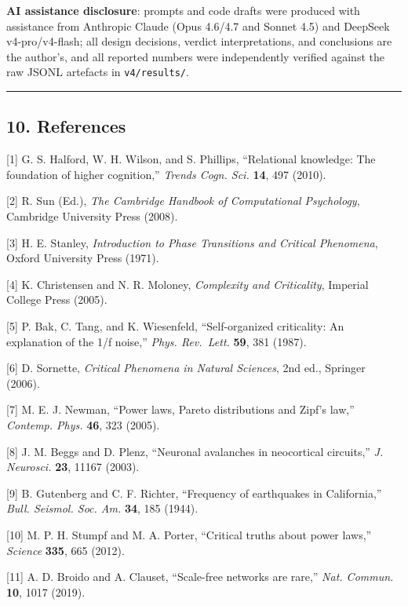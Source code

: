 \documentclass[
  letterpaper,
  11pt]{article}
\begin{document}
\textbf{AI assistance disclosure}: prompts and code drafts were produced
with assistance from Anthropic Claude (Opus 4.6/4.7 and Sonnet 4.5) and
DeepSeek v4-pro/v4-flash; all design decisions, verdict interpretations,
and conclusions are the author's, and all reported numbers were
independently verified against the raw JSONL artefacts in
\texttt{v4/results/}.

\begin{center}\rule{0.5\linewidth}{0.5pt}\end{center}

\subsection{10. References}\label{references}

{[}1{]} G. S. Halford, W. H. Wilson, and S. Phillips, ``Relational
knowledge: The foundation of higher cognition,'' \emph{Trends Cogn.
Sci.} \textbf{14}, 497 (2010).

{[}2{]} R. Sun (Ed.), \emph{The Cambridge Handbook of Computational
Psychology}, Cambridge University Press (2008).

{[}3{]} H. E. Stanley, \emph{Introduction to Phase Transitions and
Critical Phenomena}, Oxford University Press (1971).

{[}4{]} K. Christensen and N. R. Moloney, \emph{Complexity and
Criticality}, Imperial College Press (2005).

{[}5{]} P. Bak, C. Tang, and K. Wiesenfeld, ``Self-organized
criticality: An explanation of the 1/f noise,'' \emph{Phys. Rev.~Lett.}
\textbf{59}, 381 (1987).

{[}6{]} D. Sornette, \emph{Critical Phenomena in Natural Sciences}, 2nd
ed., Springer (2006).

{[}7{]} M. E. J. Newman, ``Power laws, Pareto distributions and Zipf's
law,'' \emph{Contemp. Phys.} \textbf{46}, 323 (2005).

{[}8{]} J. M. Beggs and D. Plenz, ``Neuronal avalanches in neocortical
circuits,'' \emph{J. Neurosci.} \textbf{23}, 11167 (2003).

{[}9{]} B. Gutenberg and C. F. Richter, ``Frequency of earthquakes in
California,'' \emph{Bull. Seismol. Soc. Am.} \textbf{34}, 185 (1944).

{[}10{]} M. P. H. Stumpf and M. A. Porter, ``Critical truths about power
laws,'' \emph{Science} \textbf{335}, 665 (2012).

{[}11{]} A. D. Broido and A. Clauset, ``Scale-free networks are rare,''
\emph{Nat. Commun.} \textbf{10}, 1017 (2019).
\end{document}
